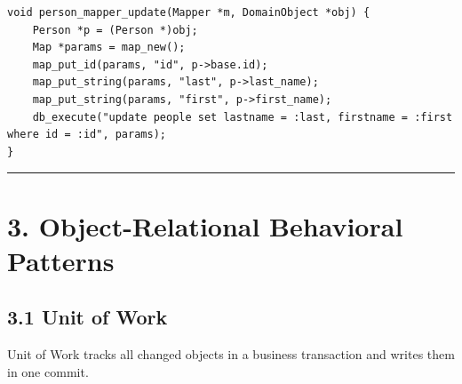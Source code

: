 \documentclass[11pt]{article}
\begin{document}
\begin{verbatim}
void person_mapper_update(Mapper *m, DomainObject *obj) {
    Person *p = (Person *)obj;
    Map *params = map_new();
    map_put_id(params, "id", p->base.id);
    map_put_string(params, "last", p->last_name);
    map_put_string(params, "first", p->first_name);
    db_execute("update people set lastname = :last, firstname = :first where id = :id", params);
}
\end{verbatim}

\begin{center}\rule{0.5\linewidth}{0.5pt}\end{center}

\section{3. Object-Relational Behavioral
Patterns}\label{object-relational-behavioral-patterns}

\subsection{3.1 Unit of Work}\label{unit-of-work}

Unit of Work tracks all changed objects in a business transaction and
writes them in one commit.
\end{document}
